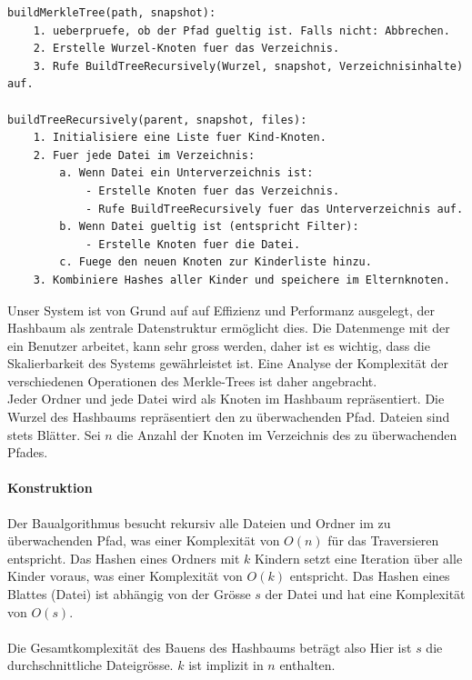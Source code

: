 \documentclass[a4paper,12pt]{report}
\begin{document}
    \begin{lstlisting}[language=Pseudo,label={lst:merkle-pseudo}]
buildMerkleTree(path, snapshot):
    1. ueberpruefe, ob der Pfad gueltig ist. Falls nicht: Abbrechen.
    2. Erstelle Wurzel-Knoten fuer das Verzeichnis.
    3. Rufe BuildTreeRecursively(Wurzel, snapshot, Verzeichnisinhalte) auf.

buildTreeRecursively(parent, snapshot, files):
    1. Initialisiere eine Liste fuer Kind-Knoten.
    2. Fuer jede Datei im Verzeichnis:
        a. Wenn Datei ein Unterverzeichnis ist:
            - Erstelle Knoten fuer das Verzeichnis.
            - Rufe BuildTreeRecursively fuer das Unterverzeichnis auf.
        b. Wenn Datei gueltig ist (entspricht Filter):
            - Erstelle Knoten fuer die Datei.
        c. Fuege den neuen Knoten zur Kinderliste hinzu.
    3. Kombiniere Hashes aller Kinder und speichere im Elternknoten.

    \end{lstlisting}


    Unser System ist von Grund auf auf Effizienz und Performanz ausgelegt, der Hashbaum als zentrale Datenstruktur ermöglicht dies.
    Die Datenmenge mit der ein Benutzer arbeitet, kann sehr gross werden, daher ist es wichtig, dass die Skalierbarkeit des Systems gewährleistet ist.
    Eine Analyse der Komplexität der verschiedenen Operationen des Merkle-Trees ist daher angebracht.
    \\
    Jeder Ordner und jede Datei wird als Knoten im Hashbaum repräsentiert.
    Die Wurzel des Hashbaums repräsentiert den zu überwachenden Pfad.
    Dateien sind stets Blätter.\newline
    Sei $n$ die Anzahl der Knoten im Verzeichnis des zu überwachenden Pfades.

    \paragraph*{Konstruktion}

    Der Baualgorithmus besucht rekursiv alle Dateien und Ordner im zu überwachenden Pfad,
    was einer Komplexität von $O(n)$ für das Traversieren entspricht.
    Das Hashen eines Ordners mit $k$ Kindern setzt eine Iteration über alle Kinder voraus, was einer Komplexität von $O(k)$ entspricht.
    Das Hashen eines Blattes (Datei) ist abhängig von der Grösse $s$ der Datei und hat eine Komplexität von $O(s)$.
    \\\\
    Die Gesamtkomplexität des Bauens des Hashbaums beträgt also 
    Hier ist $s$ die durchschnittliche Dateigrösse. $k$ ist implizit in $n$ enthalten.
\end{document}

